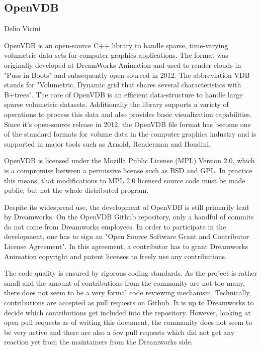 \subsection{OpenVDB}{Delio Vicini}

OpenVDB is an open-source C++ library to handle sparse, time-varying volumetric data sets for computer graphics applications. The format was originally developed at DreamWorks Animation and used to render clouds in "Puss in Boots" and subsequently open-sourced in 2012.\cite{Museth.2013} The abbreviation VDB stands for "Volumetric, Dynamic grid that
shares several characteristics with B+trees". \cite{Museth.2013} The core of OpenVDB is an efficient data-structure to handle large sparse volumetric datasets. Additionally the library supports a variety of operations to process this data and also provides basic visualization capabilities. Since it's open-source release in 2012, the OpenVDB file format has become one of the standard formats for volume data in the computer graphics industry and is supported in major tools such as Arnold, Renderman and Houdini. \cite{openvdb-about}


OpenVDB is licensed under the Mozilla Public License (MPL) Version 2.0, which is a compromise between a permissive license such as BSD and GPL. In practice this means, that modifications to MPL 2.0 licensed source code must be made public, but not the whole distributed program. \cite{mpl-faq}

Despite its widespread use, the development of OpenVDB is still primarily lead by Dreamworks. On the OpenVDB Github repository, only a handful of commits do not come from Dreamworks employees. \cite{openvdb-contribs} In order to participate in the development, one has to sign an "Open Source Software Grant and Contributor License Agreement". \cite{openvdb-agree} In this agreement, a contributor has to grant Dreamworks Animation copyright and patent licenses to freely use any contributions. 


The code quality is ensured by rigorous coding standards. \cite{openvdb-code} As the project is rather small and the amount of contributions from the community are not too many, there does not seem to be a very formal code reviewing mechanism. Technically, contributions are accepted as pull requests on Github. It is up to Dreamworks to decide which contributions get included into the repository. However, looking at open pull requests as of writing this document, the community does not seem to be very active and there are also a few pull requests which did not get any reaction yet from the maintainers from the Dreamworks side. 





